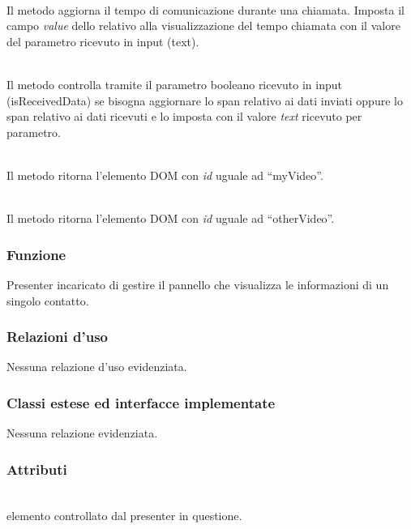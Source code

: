 \begin{description}
\item{}\\
Il metodo aggiorna il tempo di comunicazione durante una chiamata. Imposta il campo \textit{value} dello  relativo alla visualizzazione del tempo chiamata con il valore del parametro ricevuto in input (text).

\item{}\\
Il metodo controlla tramite il parametro booleano ricevuto in input (isReceivedData) se bisogna aggiornare lo span relativo ai dati inviati oppure lo span relativo ai dati ricevuti e lo imposta con il valore \textit{text} ricevuto per parametro.

\item{}\\
Il metodo ritorna l'elemento DOM con \textit{id} uguale ad ``myVideo''.

\item{}\\
Il metodo ritorna l'elemento DOM con \textit{id} uguale ad ``otherVideo''.

\end{description}


\subsubsection*{Funzione}
Presenter incaricato di gestire il pannello che visualizza le informazioni di un singolo contatto.

\subsubsection*{Relazioni d'uso}
Nessuna relazione d'uso evidenziata.

\subsubsection*{Classi estese ed interfacce implementate}

Nessuna relazione evidenziata.

\subsubsection*{Attributi}
\begin{description}
\item{}\\
  elemento controllato dal presenter in questione.
\end{description}

